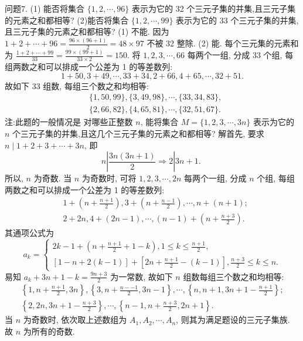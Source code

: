 问题7. (1) 能否将集合 $\{1,2, \cdots, 96\}$ 表示为它的 32 个三元子集的并集,且三元子集的元素之和都相等?
(2)能否将集合 $\{1,2, \cdots, 99\}$ 表示为它的 33 个三元子集的并集,且三元子集的元素之和都相等?
(1) 不能.
因为 $1+2+\cdots+96=\frac{96 \times(96+1)}{2}=48 \times 97$ 不被 32 整除.
(2) 能.
每个三元集的元素和为 $\frac{1+2+\cdots+99}{33}=\frac{99 \times(99+1)}{33 \times 2}=150$. 将 $1,2,3, \cdots, 66$ 每两个一组, 分成 33 个组, 每组两数之和可以排成一个公差为 1 的等差数列:
$$
1+50,3+49, \cdots, 33+34,2+66,4+65, \cdots, 32+51 .
$$
故如下 33 组数, 每组三个数之和均相等:
$$
\begin{aligned}
& \{1,50,99\},\{3,49,98\}, \cdots,\{33,34,83\}, \\
& \{2,66,82\},\{4,65,81\}, \cdots,\{32,51,67\} .
\end{aligned}
$$
注:此题的一般情况是
对哪些正整数 $n$, 能将集合 $M=\{1,2,3, \cdots, 3 n\}$ 表示为它的 $n$ 个三元子集的并集,且这几个三元子集的元素之和都相等?
解首先, 要求 $n \mid 1+2+3+\cdots+3 n$, 即
$$
n\left|\frac{3 n(3 n+1)}{2} \Rightarrow 2\right| 3 n+1 \text {. }
$$
所以, $n$ 为奇数.
当 $n$ 为奇数时, 可将 $1,2,3, \cdots, 2 n$ 每两个一组, 分成 $n$ 个组, 每组两数之和可以排成一个公差为 1 的等差数列:
$$
\begin{aligned}
& 1+\left(n+\frac{n+1}{2}\right), 3+\left(n+\frac{n-1}{2}\right), \cdots, n+(n+1) ; \\
& 2+2 n, 4+(2 n-1), \cdots,(n-1)+\left(n+\frac{n+3}{2}\right) .
\end{aligned}
$$
其通项公式为
$$
a_k=\left\{\begin{array}{l}
2 k-1+\left(n+\frac{n+1}{2}+1-k\right), 1 \leqslant k \leqslant \frac{n+1}{2}, \\
{[1-n+2(k-1)]+\left[2 n+\frac{n+1}{2}-(k-1)\right], \frac{n+3}{2} \leqslant k \leqslant n .}
\end{array}\right.
$$
易知 $a_k+3 n+1-k=\frac{9 n+3}{2}$ 为一常数, 故如下 $n$ 组数每组三个数之和均相等:
$$
\begin{gathered}
\left\{1, n+\frac{n+1}{2}, 3 n\right\},\left\{3, n+\frac{n--1}{2}, 3 n-1\right\}, \cdots,\left\{n, n+1,3 n+1-\frac{n+1}{2}\right\} ; \\
\left\{2,2 n, 3 n+1-\frac{n+3}{2}\right\}, \cdots,\left\{n-1, n+\frac{n+3}{2}, 2 n+1\right\} .
\end{gathered}
$$
当 $n$ 为奇数时, 依次取上述数组为 $A_1, A_2, \cdots, A_n$, 则其为满足题设的三元子集族.
故 $n$ 为所有的奇数.



